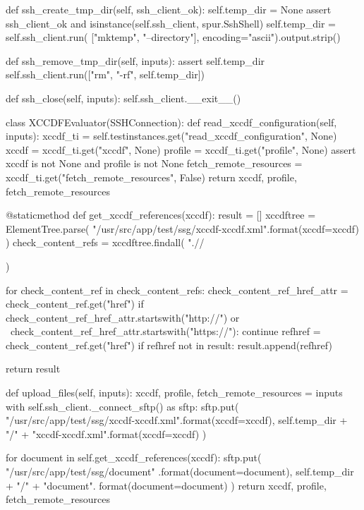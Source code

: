 \begin{python}
    def ssh_create_tmp_dir(self, ssh_client_ok):
        self.temp_dir = None
        assert ssh_client_ok and isinstance(self.ssh_client, spur.SshShell)
        self.temp_dir = self.ssh_client.run(
            ["mktemp", "--directory"], encoding="ascii").output.strip()

    def ssh_remove_tmp_dir(self, inputs):
        assert self.temp_dir
        self.ssh_client.run(["rm", "-rf", self.temp_dir])

    def ssh_close(self, inputs):
        self.ssh_client.__exit__()


class XCCDFEvaluator(SSHConnection):
    def read_xccdf_configuration(self, inputs):
        xccdf_ti = self.testinstances.get("read_xccdf_configuration", None)
        xccdf = xccdf_ti.get("xccdf", None)
        profile = xccdf_ti.get("profile", None)
        assert xccdf is not None and profile is not None
        fetch_remote_resources = xccdf_ti.get("fetch_remote_resources", False)
        return xccdf, profile, fetch_remote_resources

    @staticmethod
    def get_xccdf_references(xccdf):
        result = []
        xccdftree = ElementTree.parse(
            "/usr/src/app/test/ssg/{xccdf}-xccdf.xml".format(xccdf=xccdf)
        )
        check_content_refs = xccdftree.findall(
            ".//{%
        )

        for check_content_ref in check_content_refs:
            check_content_ref_href_attr = check_content_ref.get("href")
            if check_content_ref_href_attr.startswith("http://") or \
                    check_content_ref_href_attr.startswith("https://"):
                continue
            refhref = check_content_ref.get("href")
            if refhref not in result:
                result.append(refhref)

        return result

    def upload_files(self, inputs):
        xccdf, profile, fetch_remote_resources = inputs
        with self.ssh_client._connect_sftp() as sftp:
            sftp.put(
                "/usr/src/app/test/ssg/{xccdf}-xccdf.xml".format(xccdf=xccdf),
                self.temp_dir + "/" + "{xccdf}-xccdf.xml".format(xccdf=xccdf)
            )

            for document in self.get_xccdf_references(xccdf):
                sftp.put(
                    "/usr/src/app/test/ssg/{document}"
                    .format(document=document),
                    self.temp_dir + "/" + "{document}".
                    format(document=document)
                )
        return xccdf, profile, fetch_remote_resources

}
\end{python}
